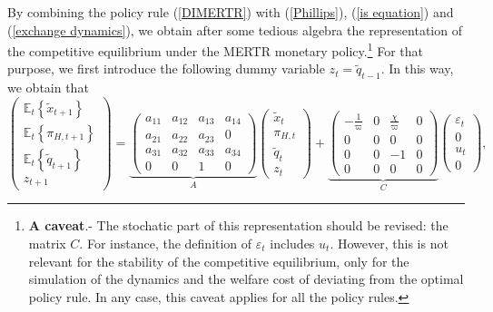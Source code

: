 \documentclass{article}
\begin{document}
By combining the policy rule (\ref{DIMERTR}) with (\ref{Phillips}), (\ref{is
equation}) and (\ref{exchange dynamics}), we obtain after some tedious
algebra the representation of the competitive equilibrium under the MERTR
monetary policy.\footnote{\textbf{A caveat}.- The stochatic part of this
representation should be revised: the matrix $C.$ For instance, the
definition of $\varepsilon _{t}$ includes $u_{t}.$ However, this is not
relevant for the stability of the competitive equilibrium, only for the
simulation of the dynamics and the welfare cost of deviating from the
optimal policy rule. In any case, this caveat applies for all the policy
rules.} For that purpose, we first introduce the following dummy variable $%
z_{t}=\widetilde{q}_{t-1}.$ In this way, we obtain that%
\begin{equation}
\left( 
\begin{array}{c}
\mathbb{E}_{t}\left\{ \widetilde{x}_{t+1}\right\} \\ 
\mathbb{E}_{t}\left\{ \pi _{H,t+1}\right\} \\ 
\mathbb{E}_{t}\left\{ \widetilde{q}_{t+1}\right\} \\ 
z_{t+1}%
\end{array}%
\right) =\underset{A}{\underbrace{\left( 
\begin{array}{cccc}
a_{11} & a_{12} & a_{13} & a_{14} \\ 
a_{21} & a_{22} & a_{23} & 0 \\ 
a_{31} & a_{32} & a_{33} & a_{34} \\ 
0 & 0 & 1 & 0%
\end{array}%
\right) }}\left( 
\begin{array}{c}
\widetilde{x}_{t} \\ 
\pi _{H,t} \\ 
\widetilde{q}_{t} \\ 
z_{t}%
\end{array}%
\right) +\underset{C}{\underbrace{\left( 
\begin{array}{cccc}
-\frac{1}{\varpi } & 0 & \frac{\chi }{\varpi } & 0 \\ 
0 & 0 & 0 & 0 \\ 
0 & 0 & -1 & 0 \\ 
0 & 0 & 0 & 0%
\end{array}%
\right) }}\left( 
\begin{array}{c}
\varepsilon _{t} \\ 
0 \\ 
u_{t} \\ 
0%
\end{array}%
\right) ,  \label{MERTR solution}
\end{equation}%
\end{document}
